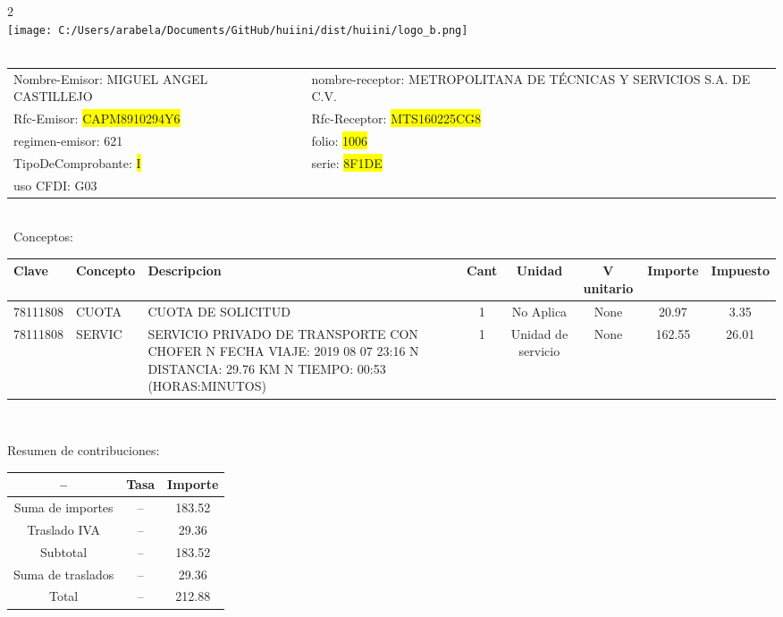 \documentclass{article}
\begin{document}
\hspace{18cm} 2\\
\texttt{[image: C:/Users/arabela/Documents/GitHub/huiini/dist/huiini/logo\_b.png]}
\bigskip\\\
\begin{tabular}{p{11cm}p{1cm}p{8cm}}

Nombre-Emisor: MIGUEL ANGEL CASTILLEJO && nombre-receptor: METROPOLITANA DE TÉCNICAS Y SERVICIOS S.A. DE C.V.\\

Rfc-Emisor: \colorbox{yellow}{ CAPM8910294Y6 } & & Rfc-Receptor: \colorbox{yellow}{ MTS160225CG8 }\\

regimen-emisor: 621 & & folio: \colorbox{yellow}{ 1006 }\\

TipoDeComprobante: \colorbox{yellow}{ I } & & serie: \colorbox{yellow}{ 8F1DE }\\

uso CFDI: G03\\



\end{tabular}
\bigskip\bigskip\bigskip\\\
Conceptos:\\
\begin{tabular}{|p{1.5cm}|p{3.6cm}|p{3.6cm}|c|c|c|c|c|}
\hline
Clave & Concepto & Descripcion & Cant & Unidad & V unitario & Importe & Impuesto \\
\hline

78111808 & CUOTA  & CUOTA DE SOLICITUD & 1 & No Aplica & None & 20.97 &  3.35 \\
\hline

78111808 & SERVIC & SERVICIO PRIVADO DE TRANSPORTE CON CHOFER  N FECHA VIAJE: 2019 08 07 23:16  N DISTANCIA: 29.76 KM  N TIEMPO: 00:53 (HORAS:MINUTOS) & 1 & Unidad de servicio & None & 162.55 &  26.01 \\
\hline

\end{tabular}\\
\bigskip
\begin{center}
Resumen de contribuciones:\\
\bigskip
\begin{tabular}{|c|c|c|}
\hline
 -- & Tasa & Importe\\
\hline

Suma de importes & -- & 183.52 \\
\hline

Traslado IVA & -- & 29.36 \\
\hline

Subtotal  & -- & 183.52 \\
\hline

Suma de traslados & -- & 29.36 \\
\hline

Total  & -- & 212.88 \\
\hline

\end{tabular}
\end{center}
\end{document}
